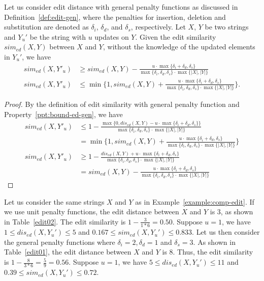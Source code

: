 \begin{property}\label{ppt:bound-es-gen}

Let us consider edit distance with general penalty functions as discussed in Definition~\ref{def:edit-gen}, where the penalties for insertion, deletion and substitution are denoted as $\delta_i$, $\delta_d$, and $\delta_s$, respectively.  Let $X$, $Y$ be two strings and $Y_u'$ be the string with $u$ updates on $Y$.  Given the edit similarity $sim_{ed}(X, Y)$ between $X$ and $Y$, without the knowledge of the updated elements in $Y_u'$, we have 
\begin{align}
sim_{ed}(X, Y'_u) &\geq sim_{ed}(X, Y)-\frac{u\cdot \max\{\delta_i + \delta_d, \delta_s\}}{\max\{\delta_i, \delta_d, \delta_s\} \cdot \max\{|X|, |Y|\}}\\
sim_{ed}(X, Y'_u) &\leq \min\{1, sim_{ed}(X,Y)+\frac{u \cdot \max\{\delta_i + \delta_d, \delta_s\}}{\max\{\delta_i, \delta_d, \delta_s\} \cdot \max\{|X|, |Y|\}}\}.
\end{align}
\end{property}

\begin{proof}
By the definition of edit similarity with general penalty function and Property~\ref{ppt:bound-ed-gen}, we have 
\begin{align*} 
sim_{ed}(X, Y'_u) &\leq 1 - \frac{\max\{0, dis_{ed}(X, Y) - u \cdot \max\{\delta_i + \delta_d, \delta_s\} \}}{\max\{\delta_i, \delta_d, \delta_s\} \cdot \max\{|X|, |Y|\}}\\
&=\min\{1, sim_{ed}(X,Y)+\frac{u \cdot \max\{\delta_i + \delta_d, \delta_s\}}{\max\{\delta_i, \delta_d, \delta_s\} \cdot \max\{|X|, |Y|\}}\}\\
sim_{ed}(X, Y'_u) &\geq 1 - \frac{dis_{ed}(X, Y) + u \cdot \max\{\delta_i + \delta_d, \delta_s\}}{\max\{\delta_i, \delta_d, \delta_s\} \cdot \max\{|X|, |Y|\}}\\
&= sim_{ed}(X, Y)-\frac{u\cdot \max\{\delta_i + \delta_d, \delta_s\}}{\max\{\delta_i, \delta_d, \delta_s\} \cdot \max\{|X|, |Y|\}}
\end{align*}
\end{proof}


\begin{example}\label{example:bound-ed}
Let us consider the same strings $X$ and $Y$ as in Example~\ref{example:comp-edit}. If we use unit penalty functions, the edit distance between $X$ and $Y$ is $3$, as shown in Table~\ref{edit02}. The edit similarity is $1-\frac{3}{1*6}=0.50$. Suppose $u=1$, we have $1 \leq dis_{ed}(X, Y_u') \leq 5$ and $0.167 \leq sim_{ed}(X, Y_u') \leq 0.833$. Let us then consider the general penalty functions where $\delta_i = 2, \delta_d = 1$ and $\delta_s = 3$. As shown in Table~\ref{edit01}, the edit distance between $X$ and $Y$ is $8$. Thus, the edit similarity is $1-\frac{8}{3*6} = \frac{5}{9} = 0.56$. Suppose $u=1$, we have $5 \leq dis_{ed}(X, Y_u') \leq 11$ and $0.39 \leq sim_{ed}(X, Y_u') \leq 0.72$.       
\end{example}


